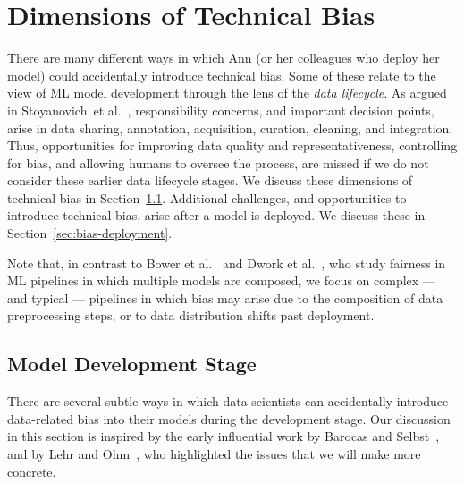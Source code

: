 \documentclass[11pt]{article}
\newcommand{\etal}{et al.\xspace}
\begin{document}
\section{Dimensions of Technical Bias}
\label{sec:dim}

There are many different ways in which Ann (or her colleagues who deploy her model) could accidentally introduce technical bias.  Some of these relate to the view of ML model development through the lens of the \emph{data lifecycle}. As argued in Stoyanovich~\etal~\cite{DBLP:journals/pvldb/StoyanovichHJ20}, responsibility concerns, and important decision points, arise in data sharing, annotation, acquisition, curation, cleaning, and integration.   Thus, opportunities for improving data quality and representativeness, controlling for bias, and allowing humans to oversee the process, are missed if we do not consider these earlier data lifecycle stages.  We discuss these dimensions of technical bias in Section~\ref{sec:bias-development}.  Additional challenges, and opportunities to introduce technical bias, arise after a model is deployed.  We discuss these in Section~\ref{sec:bias-deployment}.

Note that, in contrast to Bower \etal~\cite{DBLP:journals/corr/BowerKNSVV17} and Dwork \etal~\cite{DBLP:conf/forc/DworkIJ20}, who study fairness in ML pipelines in which multiple models are composed, we focus on complex --- and typical --- pipelines in which bias may arise due to the composition of data preprocessing steps, or to data distribution shifts past deployment.  

\subsection{Model Development Stage}
\label{sec:bias-development}

There are several subtle ways in which data scientists can accidentally introduce data-related bias into their models during the development stage.  Our discussion in this section is inspired by the early influential work by Barocas and Selbst~\cite{Barocas2016}, and by Lehr and Ohm~\cite{LehrOhm2017}, who highlighted the issues that we will make more concrete.
\end{document}
